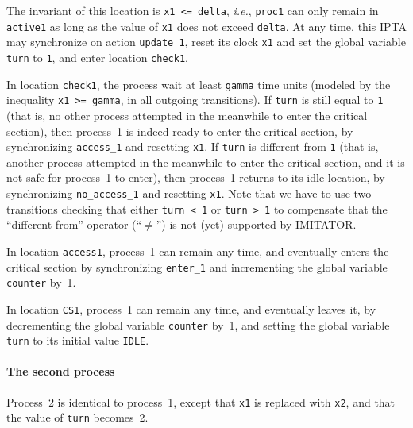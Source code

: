 \documentclass[a4paper,11pt]{report}
\makeatletter
\newcommand{\imitator}{\textsf{IMITATOR}}
\newcommand{\IPTA}{IPTA}
\newcommand{\styleIMI}[1]{\textcolor{imicolor}{\texttt{#1}}}
\newcommand{\ie}{\textcolor{colorok}{\textit{i.e.},\@}}
\makeatother
\begin{document}
The invariant of this location is \styleIMI{x1 <= delta}, \ie{} \styleIMI{proc1} can only remain in \styleIMI{active1} as long as the value of \styleIMI{x1} does not exceed \styleIMI{delta}.
At any time, this \IPTA{} may synchronize on action \styleIMI{update\_1}, reset its clock \styleIMI{x1} and set the global variable \styleIMI{turn} to \styleIMI{1}, and enter location \styleIMI{check1}.

In location \styleIMI{check1}, the process wait at least \styleIMI{gamma} time units (modeled by the inequality \styleIMI{x1 >= gamma}, in all outgoing transitions).
If \styleIMI{turn} is still equal to \styleIMI{1} (that is, no other process attempted in the meanwhile to enter the critical section), then process~1 is indeed ready to enter the critical section, by synchronizing \styleIMI{access\_1} and resetting \styleIMI{x1}.
If \styleIMI{turn} is different from \styleIMI{1} (that is, another process attempted in the meanwhile to enter the critical section, and it is not safe for process~1 to enter), then process~1 returns to its idle location, by synchronizing \styleIMI{no\_access\_1} and resetting \styleIMI{x1}.
Note that we have to use two transitions checking that either \styleIMI{turn < 1} or \styleIMI{turn > 1} to compensate that the ``different from'' operator (``\styleIMI{$\neq$}'') is not (yet) supported by \imitator{}.

In location \styleIMI{access1}, process~1 can remain any time, and eventually enters the critical section by synchronizing \styleIMI{enter\_1} and incrementing the global variable \styleIMI{counter} by~1.

In location \styleIMI{CS1}, process~1 can remain any time, and eventually leaves it, by decrementing the global variable \styleIMI{counter} by~1, and setting the global variable \styleIMI{turn} to its initial value \styleIMI{IDLE}.

\paragraph{The second process}
Process~2 is identical to process~1, except that \styleIMI{x1} is replaced with \styleIMI{x2}, and that the value of \styleIMI{turn} becomes~2.
\end{document}

